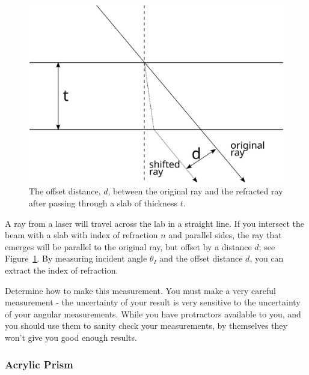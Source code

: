 \documentclass[12pt]{article}
\begin{document}
\begin{figure}
  \centering
  \includegraphics[width=\textwidth/2]{figures/slab}
  \caption{The offset distance, $d$, between the original ray and the
    refracted ray after passing through a slab of thickness $t$.}
  \label{fig:cube}
\end{figure}

A ray from a laser will travel across the lab in a straight line.  If
you intersect the beam with a slab with index of refraction $n$ and
parallel sides, the ray that emerges will be parallel to the original
ray, but offset by a distance $d$; see Figure~\ref{fig:cube}.  By
measuring incident angle $\theta_I$ and the offset distance $d$, you
can extract the index of refraction.

Determine how to make this measurement.  You must make a very careful
measurement - the uncertainty of your result is very sensitive to the
uncertainty of your angular measurements.  While you have protractors
available to you, and you should use them to sanity check your
measurements, by themselves they won't give you good enough results.

\subsubsection{Acrylic Prism}
\label{sec:prism}
\end{document}
